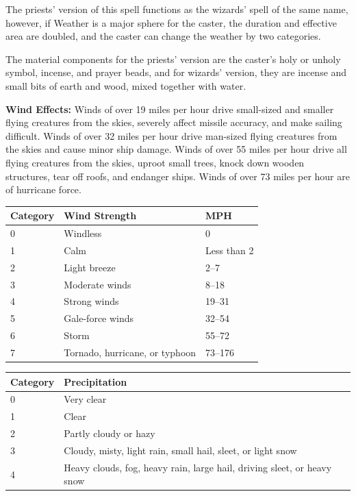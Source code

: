 \begin{multicols}{2}
The priests' version of this spell functions as the wizards' spell of the same name, however, if Weather is a major sphere for the caster, the duration and effective area are doubled, and the caster can change the weather by two categories.

The material components for the priests' version are the caster's holy or unholy symbol, incense, and prayer beads, and for wizards' version, they are incense and small bits of earth and wood, mixed together with water.

\textbf{Wind Effects:} Winds of over 19 miles per hour drive small-sized and smaller flying creatures from the skies, severely affect missile accuracy, and make sailing difficult.  Winds of over 32 miles per hour drive man-sized flying creatures from the skies and cause minor ship damage.  Winds of over 55 miles per hour drive all flying creatures from the skies, uproot small trees, knock down wooden structures, tear off roofs, and endanger ships.  Winds of over 73 miles per hour are of hurricane force.

\noindent
\begin{tabular}{|p{}|p{}|p{}|}
\hline
Category	& Wind Strength	& MPH \\
\hline\hline
\rowcolor[gray]{.9}0	& Windless	& 0 \\
1	& Calm	& Less than 2 \\
\rowcolor[gray]{.9}2	& Light breeze	& 2--7 \\
3	& Moderate winds	& 8--18 \\
\rowcolor[gray]{.9}4	& Strong winds	& 19--31 \\
5	& Gale-force winds	& 32--54 \\
\rowcolor[gray]{.9}6	& Storm	& 55--72 \\
7	& Tornado, hurricane, or typhoon	& 73--176 \\
\hline
\end{tabular}

\noindent
\begin{tabular}{|p{}|p{}|}
\hline
Category	& Precipitation \\
\hline\hline
\rowcolor[gray]{.9}0	& Very clear \\
1	& Clear \\
\rowcolor[gray]{.9}2	& Partly cloudy or hazy \\
3	& Cloudy, misty, light rain, small hail, sleet, or light snow \\
\rowcolor[gray]{.9}4	& Heavy clouds, fog, heavy rain, large hail, driving sleet, or heavy snow \\
\hline
\end{tabular}


\end{multicols}
